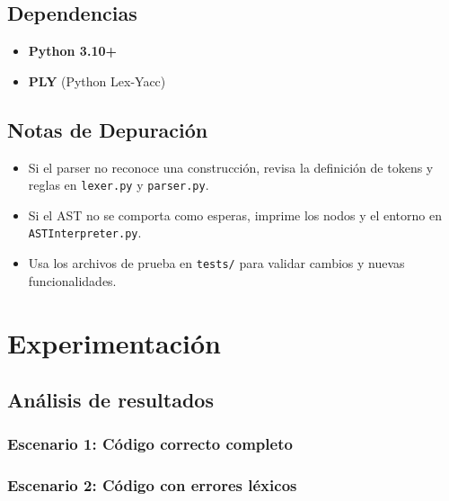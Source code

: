 \documentclass{article}
\begin{document}
\subsection{Dependencias}

\begin{itemize}
    \item \textbf{Python 3.10+}
    \item \textbf{PLY} (Python Lex-Yacc)
\end{itemize}

\subsection{Notas de Depuración}

\begin{itemize}
    \item Si el parser no reconoce una construcción, revisa la definición de tokens y reglas en \texttt{lexer.py} y \texttt{parser.py}.
    \item Si el AST no se comporta como esperas, imprime los nodos y el entorno en \texttt{ASTInterpreter.py}.
    \item Usa los archivos de prueba en \texttt{tests/} para validar cambios y nuevas funcionalidades.
\end{itemize}



\section{Experimentación}\label{sec:exp}

\subsection{Análisis de resultados}

\subsubsection{Escenario 1: Código correcto completo}



\subsubsection{Escenario 2: Código con errores léxicos}
\end{document}
